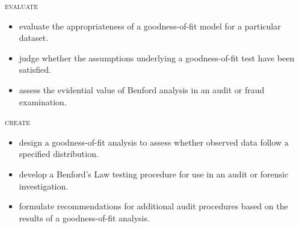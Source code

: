 \noindent \textsc{evaluate}
\begin{itemize}
\item evaluate the appropriateness of a goodness-of-fit model for a particular dataset.
\item judge whether the assumptions underlying a goodness-of-fit test have been satisfied.
\item assess the evidential value of Benford analysis in an audit or fraud examination.
\end{itemize}
\noindent \textsc{create}
\begin{itemize}
\item design a goodness-of-fit analysis to assess whether observed data follow a specified distribution.
\item develop a Benford's Law testing procedure for use in an audit or forensic investigation.
\item formulate recommendations for additional audit procedures based on the results of a goodness-of-fit analysis.
\end{itemize}



